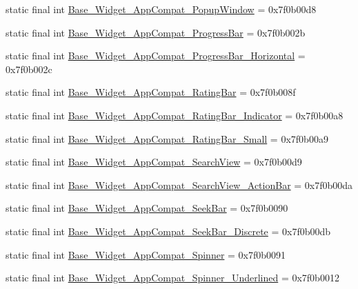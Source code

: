 \begin{CompactItemize}
\item 
static final int \hyperlink{classandroid_1_1support_1_1v4_1_1_r_1_1style_f736e6fcf9f3c0e430dbbbc493d66500}{Base\_\-Widget\_\-AppCompat\_\-PopupWindow} = 0x7f0b00d8
\item 
static final int \hyperlink{classandroid_1_1support_1_1v4_1_1_r_1_1style_18c0b9075b4b5ccaf1dc92e94245a4fc}{Base\_\-Widget\_\-AppCompat\_\-ProgressBar} = 0x7f0b002b
\item 
static final int \hyperlink{classandroid_1_1support_1_1v4_1_1_r_1_1style_f1df758f52a49e0e66dcad761ac14e60}{Base\_\-Widget\_\-AppCompat\_\-ProgressBar\_\-Horizontal} = 0x7f0b002c
\item 
static final int \hyperlink{classandroid_1_1support_1_1v4_1_1_r_1_1style_9623ae3da3acf26006f02588e254d467}{Base\_\-Widget\_\-AppCompat\_\-RatingBar} = 0x7f0b008f
\item 
static final int \hyperlink{classandroid_1_1support_1_1v4_1_1_r_1_1style_3ff0c3a0f48e2ae4f3328dc7d28b6c41}{Base\_\-Widget\_\-AppCompat\_\-RatingBar\_\-Indicator} = 0x7f0b00a8
\item 
static final int \hyperlink{classandroid_1_1support_1_1v4_1_1_r_1_1style_f19934301ba73f128ef15d7283e43644}{Base\_\-Widget\_\-AppCompat\_\-RatingBar\_\-Small} = 0x7f0b00a9
\item 
static final int \hyperlink{classandroid_1_1support_1_1v4_1_1_r_1_1style_e11a2d082f1604643affffdea99e0d9d}{Base\_\-Widget\_\-AppCompat\_\-SearchView} = 0x7f0b00d9
\item 
static final int \hyperlink{classandroid_1_1support_1_1v4_1_1_r_1_1style_af8525efccbaadaf6d64b20650bef73c}{Base\_\-Widget\_\-AppCompat\_\-SearchView\_\-ActionBar} = 0x7f0b00da
\item 
static final int \hyperlink{classandroid_1_1support_1_1v4_1_1_r_1_1style_292e4a269cd38735eb37cf3156ee9fae}{Base\_\-Widget\_\-AppCompat\_\-SeekBar} = 0x7f0b0090
\item 
static final int \hyperlink{classandroid_1_1support_1_1v4_1_1_r_1_1style_b6c63aeb60fd6f1fe3b3380a00e856d6}{Base\_\-Widget\_\-AppCompat\_\-SeekBar\_\-Discrete} = 0x7f0b00db
\item 
static final int \hyperlink{classandroid_1_1support_1_1v4_1_1_r_1_1style_23eea35b879716445897398c42798d4f}{Base\_\-Widget\_\-AppCompat\_\-Spinner} = 0x7f0b0091
\item 
static final int \hyperlink{classandroid_1_1support_1_1v4_1_1_r_1_1style_d60d6d34f26137d2235e9b73320cea13}{Base\_\-Widget\_\-AppCompat\_\-Spinner\_\-Underlined} = 0x7f0b0012
\item 

\end{CompactItemize}
